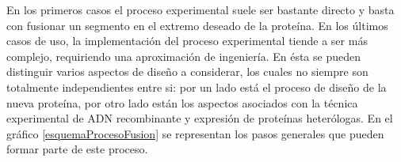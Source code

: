 % 

En los primeros casos el proceso experimental suele ser bastante directo y basta con fusionar un segmento en el extremo deseado de la proteína. 
En los últimos casos de uso, la implementación del proceso experimental tiende a ser más complejo, requiriendo una aproximación de ingeniería. 
En ésta se pueden distinguir varios aspectos de diseño a considerar, los cuales no siempre son totalmente independientes entre si:
por un lado está el proceso de diseño de la nueva proteína, por otro lado están los aspectos asociados con la técnica experimental de ADN recombinante y expresión de proteínas heterólogas. 
En el gráfico \ref{esquemaProcesoFusion} se representan los pasos generales que pueden formar parte de este proceso.

